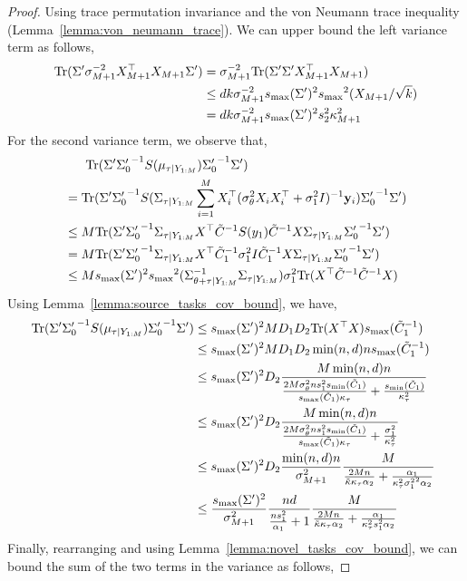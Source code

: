 \begin{proof}
Using trace permutation invariance and the von Neumann trace inequality (Lemma~\ref{lemma:von_neumann_trace}). We can upper bound the left variance term as follows,
\begin{align}
\mathrm{Tr}({\Sigma'} \sigma_{M+1}^{-2} X_{M+1}^\top X_{M+1} {\Sigma'}) &=  \sigma_{M+1}^{-2} \mathrm{Tr}({\Sigma'}{\Sigma'} X_{M+1}^\top X_{M+1})\\
&\le d {k} \sigma_{M+1}^{-2} {s_{\max}}({\Sigma'})^2 {s_{\max}}^2(X_{M+1}/\sqrt{{k}})\\
&= d {k} \sigma_{M+1}^{-2} {s_{\max}}({\Sigma'})^2 s_2^2 \kappa_{M+1}^2 
\end{align}
For the second variance term, we observe that,
\begin{align}
& \ \ \ \ \ \mathrm{Tr}({\Sigma'} {\Sigma'_{0}}^{-1} S(\mu_{\tau \vert Y_{1:M}}) {\Sigma'_{0}}^{-1} {\Sigma'}) \\
&=\mathrm{Tr}({\Sigma'} {\Sigma'_{0}}^{-1} S(\Sigma_{\tau \vert Y_{1:M}} \sum^{M}_{i=1}X_{i}^\top (\sigma_\theta^2 X_{i} X_{i}^\top + \sigma_1^2 I)^{-1}\mathbf{y}_{i}) {\Sigma'_{0}}^{-1} {\Sigma'})\\
&\leq M\mathrm{Tr}({\Sigma'} {\Sigma'_{0}}^{-1} \Sigma_{\tau \vert Y_{1:M}} X_{}^\top \tilde{C}_{}^{-1} S(y_1) \tilde{C}_{}^{-1} X_{} \Sigma_{\tau \vert Y_{1:M}} {\Sigma'_{0}}^{-1} {\Sigma'})\\
&=M\mathrm{Tr}({\Sigma'} {\Sigma'_{0}}^{-1} \Sigma_{\tau \vert Y_{1:M}} X_{}^\top \tilde{C}_{1}^{-1} \sigma_1^2 I \tilde{C}_{1}^{-1} X_{} \Sigma_{\tau \vert Y_{1:M}} {\Sigma'_{0}}^{-1} {\Sigma'})\\
&\le M{s_{\max}}({\Sigma'})^2 {s_{\max}}^2(\Sigma_{\theta + \tau \vert Y_{1:M}}^{-1} \Sigma_{\tau \vert Y_{1:M}}) {\sigma_1^2} \mathrm{Tr}(X_{}^\top \tilde{C}_{}^{-1} \tilde{C}_{}^{-1} X_{})
\end{align}
Using Lemma~\ref{lemma:source_tasks_cov_bound}, we have,
\begin{align}
\mathrm{Tr}({\Sigma'} {\Sigma'_{0}}^{-1} S(\mu_{\tau \vert Y_{1:M}}) {\Sigma'_{0}}^{-1} {\Sigma'}) &\le {s_{\max}}({\Sigma'})^2 M D_1 D_2 \mathrm{Tr}(X_{}^\top X_{}) {s_{\max}}(\tilde{C}_{1}^{-1})\\
& \le {s_{\max}}({\Sigma'})^2 M D_1 D_2 \min({n},d) {n} {s_{\max}}(\tilde{C}_{1}^{-1})\\
& \le {s_{\max}}({\Sigma'})^2 D_2 \frac{M\min({n},d) {n}}{\frac{2M{\sigma_\theta^2}{n} s_1^2 {s_{\min}}(\tilde{C}_{1})}{{s_{\max}}(\tilde{C}_{1})\kappa_\tau} + \frac{{s_{\min}}(\tilde{C}_{1})}{\kappa_\tau^2}} \ \\
& \le {s_{\max}}({\Sigma'})^2 D_2 \frac{M\min({n},d) {n}}{\frac{2M{\sigma_\theta^2}{n} s_1^2 {s_{\min}}(\tilde{C}_{1})}{{s_{\max}}(\tilde{C}_{1})\kappa_\tau} + \frac{{\sigma_1^2}}{\kappa_\tau^2}} \ \\
& \le {s_{\max}}({\Sigma'})^2 D_2 \frac{\min({n},d) {n}}{\sigma_{M+1}^2} \frac{M}{\frac{2M{n}}{\tilde{\kappa} \kappa_\tau \alpha_2} + \frac{\alpha_1}{\kappa_\tau^2 {\sigma_1^2}^2 \alpha_2}} \ \\
& \le  \frac{{s_{\max}}({\Sigma'})^2}{\sigma_{M+1}^2}  \frac{{n} d}{ \frac{{n}s_1^2}{\alpha_1} + 1}  \frac{M}{\frac{2M {n}}{\tilde{\kappa} \kappa_\tau \alpha_2} + \frac{\alpha_1}{\kappa_\tau^2 s_1^2 \alpha_2}}
\end{align}
Finally, rearranging and using Lemma~\ref{lemma:novel_tasks_cov_bound}, we can bound the sum of the two terms in the variance as follows,

\end{proof}
